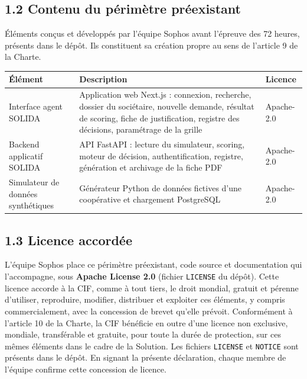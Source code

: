 \documentclass[11pt,a4paper]{article}
\begin{document}
\subsection*{1.2 Contenu du périmètre préexistant}

Éléments conçus et développés par l'équipe Sophos avant l'épreuve des 72 heures, présents dans le
dépôt. Ils constituent sa création propre au sens de l'article 9 de la Charte.

\begin{center}
\footnotesize
\renewcommand{\arraystretch}{1.25}
\begin{tabular}{@{}p{3.9cm} p{8.6cm} p{2.3cm}@{}}
\toprule
\textbf{Élément} & \textbf{Description} & \textbf{Licence} \\
\midrule
Interface agent SOLIDA & Application web Next.js : connexion, recherche, dossier du sociétaire, nouvelle demande, résultat de scoring, fiche de justification, registre des décisions, paramétrage de la grille & Apache-2.0 \\
Backend applicatif SOLIDA & API FastAPI : lecture du simulateur, scoring, moteur de décision, authentification, registre, génération et archivage de la fiche PDF & Apache-2.0 \\
Simulateur de données synthétiques & Générateur Python de données fictives d'une coopérative et chargement PostgreSQL & Apache-2.0 \\
\bottomrule
\end{tabular}
\end{center}

\subsection*{1.3 Licence accordée}

L'équipe Sophos place ce périmètre préexistant, code source et documentation qui l'accompagne,
sous \textbf{Apache License 2.0} (fichier \texttt{LICENSE} du dépôt). Cette licence accorde à la
CIF, comme à tout tiers, le droit mondial, gratuit et pérenne d'utiliser, reproduire, modifier,
distribuer et exploiter ces éléments, y compris commercialement, avec la concession de brevet
qu'elle prévoit. Conformément à l'article 10 de la Charte, la CIF bénéficie en outre d'une licence
non exclusive, mondiale, transférable et gratuite, pour toute la durée de protection, sur ces
mêmes éléments dans le cadre de la Solution. Les fichiers \texttt{LICENSE} et \texttt{NOTICE} sont
présents dans le dépôt. En signant la présente déclaration, chaque membre de l'équipe confirme
cette concession de licence.
\end{document}
